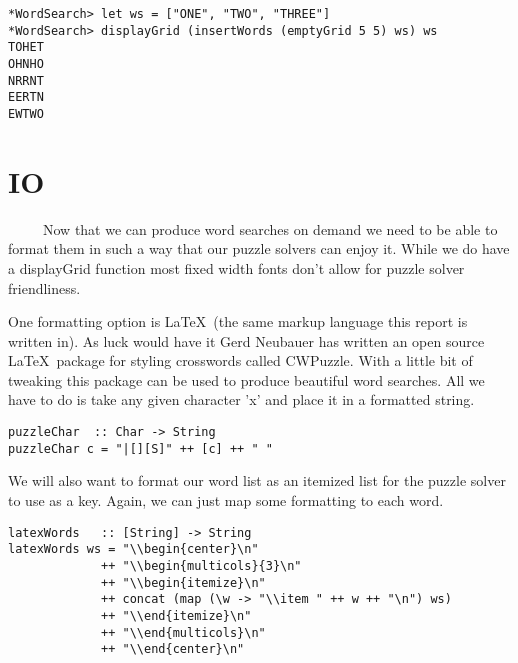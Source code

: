 \documentclass[12pt]{report}   %
\begin{document}
    \pagebreak

    \begin{lstlisting}
*WordSearch> let ws = ["ONE", "TWO", "THREE"]
*WordSearch> displayGrid (insertWords (emptyGrid 5 5) ws) ws
TOHET
OHNHO
NRRNT
EERTN
EWTWO
    \end{lstlisting}


\section*{IO}
    \ \ \ \ \ Now that we can produce word searches on demand we need to be
    able to format them in such a way that our puzzle solvers can enjoy it.
    While we do have a displayGrid function most fixed width fonts don't allow
    for puzzle solver friendliness.

    \vspace{12pt}

    One formatting option is \LaTeX \ (the same markup language this report is
    written in). As luck would have it Gerd Neubauer has written an open source
    \LaTeX \ package for styling crosswords called CWPuzzle. With a little bit of 
    tweaking this package can be used to produce beautiful word searches. All
    we have to do is take any given character 'x' and place it in a formatted
    string.

    \vspace{12pt}

    \begin{lstlisting}
puzzleChar  :: Char -> String
puzzleChar c = "|[][S]" ++ [c] ++ " "
    \end{lstlisting}

    \vspace{12pt}

    We will also want to format our word list as an itemized list for the
    puzzle solver to use as a key. Again, we can just map some formatting to
    each word.

    \vspace{12pt}

    \begin{lstlisting}
latexWords   :: [String] -> String
latexWords ws = "\\begin{center}\n"
             ++ "\\begin{multicols}{3}\n"
             ++ "\\begin{itemize}\n"
             ++ concat (map (\w -> "\\item " ++ w ++ "\n") ws)
             ++ "\\end{itemize}\n"
             ++ "\\end{multicols}\n"
             ++ "\\end{center}\n"
    \end{lstlisting}
\end{document}

